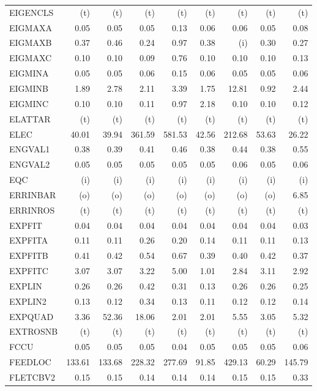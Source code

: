 \documentclass[11pt,twoside]{article}
\begin{document}
{\begin{longtable}[c]{|l|r|r|r|r|r|r|r|r|}
EIGENCLS & (t) & (t) & (t) & (t) & (t) & (t) & (t) & (t) \\
EIGMAXA & 0.05 & 0.05 & 0.05 & 0.13 & 0.06 & 0.06 & 0.05 & 0.08 \\
EIGMAXB & 0.37 & 0.46 & 0.24 & 0.97 & 0.38 & (i) & 0.30 & 0.27 \\
EIGMAXC & 0.10 & 0.10 & 0.09 & 0.76 & 0.10 & 0.10 & 0.10 & 0.13 \\
EIGMINA & 0.05 & 0.05 & 0.06 & 0.15 & 0.06 & 0.05 & 0.05 & 0.06 \\
EIGMINB & 1.89 & 2.78 & 2.11 & 3.39 & 1.75 & 12.81 & 0.92 & 2.44 \\
EIGMINC & 0.10 & 0.10 & 0.11 & 0.97 & 2.18 & 0.10 & 0.10 & 0.12 \\
ELATTAR & (t) & (t) & (t) & (t) & (t) & (t) & (t) & (t) \\
ELEC & 40.01 & 39.94 & 361.59 & 581.53 & 42.56 & 212.68 & 53.63 & 26.22 \\
ENGVAL1 & 0.38 & 0.39 & 0.41 & 0.46 & 0.38 & 0.44 & 0.38 & 0.55 \\
ENGVAL2 & 0.05 & 0.05 & 0.05 & 0.05 & 0.05 & 0.06 & 0.05 & 0.06 \\
EQC & (i) & (i) & (i) & (i) & (i) & (i) & (i) & (i) \\
ERRINBAR & (o) & (o) & (o) & (o) & (o) & (o) & (o) & 6.85 \\
ERRINROS & (t) & (t) & (t) & (t) & (t) & (t) & (t) & (t) \\
EXPFIT & 0.04 & 0.04 & 0.04 & 0.04 & 0.04 & 0.04 & 0.04 & 0.03 \\
EXPFITA & 0.11 & 0.11 & 0.26 & 0.20 & 0.14 & 0.11 & 0.11 & 0.13 \\
EXPFITB & 0.41 & 0.42 & 0.54 & 0.67 & 0.39 & 0.40 & 0.42 & 0.37 \\
EXPFITC & 3.07 & 3.07 & 3.22 & 5.00 & 1.01 & 2.84 & 3.11 & 2.92 \\
EXPLIN & 0.26 & 0.26 & 0.42 & 0.31 & 0.13 & 0.26 & 0.26 & 0.25 \\
EXPLIN2 & 0.13 & 0.12 & 0.34 & 0.13 & 0.11 & 0.12 & 0.12 & 0.14 \\
EXPQUAD & 3.36 & 52.36 & 18.06 & 2.01 & 2.01 & 5.55 & 3.05 & 5.32 \\
EXTROSNB & (t) & (t) & (t) & (t) & (t) & (t) & (t) & (t) \\
FCCU & 0.05 & 0.05 & 0.05 & 0.04 & 0.05 & 0.05 & 0.05 & 0.06 \\
FEEDLOC & 133.61 & 133.68 & 228.32 & 277.69 & 91.85 & 429.13 & 60.29 & 145.79 \\
FLETCBV2 & 0.15 & 0.15 & 0.14 & 0.14 & 0.14 & 0.15 & 0.15 & 0.33 \\

\end{longtable}}
\end{document}
